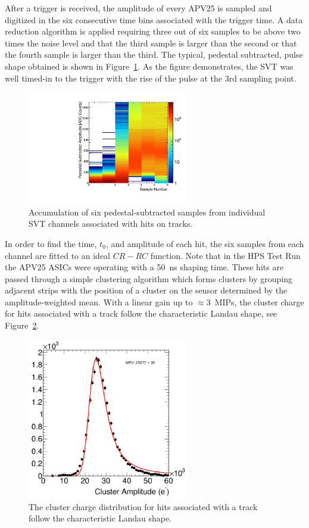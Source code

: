 \documentclass[final,3p,times,twocolumn]{elsarticle}
\begin{document}
After a trigger is received, the amplitude of every APV25 is sampled and digitized in the six consecutive time 
bins associated with the trigger time. A data reduction algorithm is applied 
requiring three out of six samples to be above two times the noise level and that the third sample is 
larger than the second or that the fourth sample is larger than the third.
The typical, pedestal subtracted, pulse shape obtained is shown in Figure~\ref{fig:pulse_shape}. 
As the figure demonstrates,  the SVT was well timed-in to the trigger with the rise of the pulse at the 3rd 
sampling point. 
\begin{figure}[]
\begin{center}
\includegraphics[width=7cm]{run1351_110513_samples_L1_top.pdf}
\caption{\small Accumulation of six pedestal-subtracted samples from individual SVT channels associated 
with hits on tracks.
\label{fig:pulse_shape}}
\end{center}
\end{figure}
In order to find the time, $t_0$, and amplitude of each hit, the six samples from each channel are fitted 
to an ideal $CR-RC$ function. Note that in the HPS Test Run the APV25 ASICs were operating with a 50~ns 
shaping time. These hits are passed through a simple clustering algorithm which forms clusters by 
grouping adjacent strips with the position of a cluster on the sensor determined by the 
amplitude-weighted mean.
With a linear gain up to $\approx 3$~MIPs, the cluster charge for hits associated with a track follow 
the characteristic Landau shape, see Figure~\ref{fig:cluster_pulse}.  
\begin{figure}[]
\begin{center}
\includegraphics[width=7cm]{mip_top_layer_2.png}
\caption{\small The cluster charge distribution for hits associated with a track follow the characteristic Landau shape. 
\label{fig:cluster_pulse}}
\end{center}
\end{figure}
\end{document}

